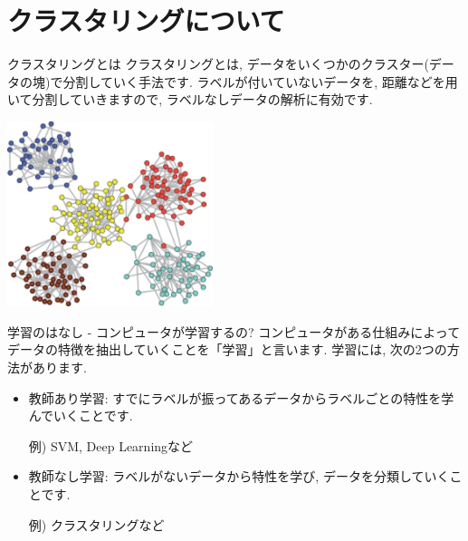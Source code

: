\documentclass[dvipdfmx,11pt]{beamer}
\theoremstyle{definition}
\begin{document}
\section{クラスタリングについて}
\begin{frame}{クラスタリングとは}
クラスタリングとは, データをいくつかのクラスター(データの塊)で分割していく手法です. ラベルが付いていないデータを, 距離などを用いて分割していきますので, ラベルなしデータの解析に有効です. 
\begin{center}
\includegraphics[width=6cm]{images/cluster_graph.eps}
\end{center}

\end{frame}

\begin{frame}{学習のはなし - コンピュータが学習するの?}
コンピュータがある仕組みによってデータの特徴を抽出していくことを「学習」と言います. 学習には, 次の2つの方法があります.
\begin{itemize}
\item 教師あり学習: すでにラベルが振ってあるデータからラベルごとの特性を学んでいくことです. \

\hspace{0.5cm} 例) SVM, Deep Learningなど
\item 教師なし学習: ラベルがないデータから特性を学び, データを分類していくことです. \

\hspace{0.5cm} 例) クラスタリングなど
\end{itemize}
\end{frame}
\end{document}
